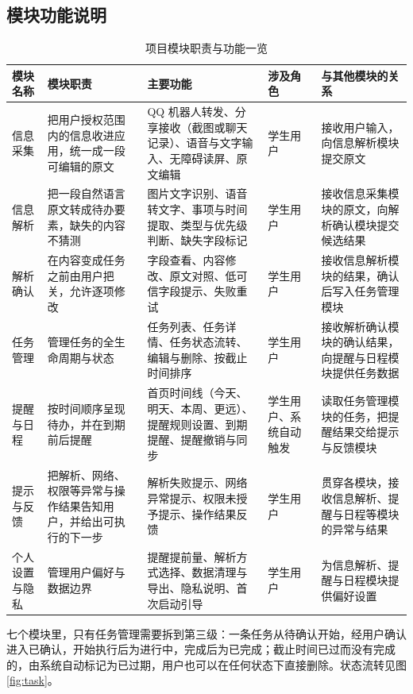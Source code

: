 \documentclass[12pt,a4paper,fontset=windows]{ctexart}
\begin{document}
\subsection{模块功能说明}

\begin{table}[tbp]
\centering
\footnotesize
\begin{tabularx}{\textwidth}{@{}>{\raggedright\arraybackslash}p{2.05cm}>{\raggedright\arraybackslash}p{2.5cm}>{\raggedright\arraybackslash}X>{\raggedright\arraybackslash}p{1.5cm}>{\raggedright\arraybackslash}p{3.75cm}@{}}
\toprule
模块名称 & 模块职责 & 主要功能 & 涉及角色 & 与其他模块的关系 \\
\midrule
信息采集 & 把用户授权范围内的信息收进应用，统一成一段可编辑的原文 & QQ 机器人转发、分享接收（截图或聊天记录）、语音与文字输入、无障碍读屏、原文编辑 & 学生用户 & 接收用户输入，向信息解析模块提交原文 \\
\midrule
信息解析 & 把一段自然语言原文转成待办要素，缺失的内容不猜测 & 图片文字识别、语音转文字、事项与时间提取、类型与优先级判断、缺失字段标记 & 学生用户 & 接收信息采集模块的原文，向解析确认模块提交候选结果 \\
\midrule
解析确认 & 在内容变成任务之前由用户把关，允许逐项修改 & 字段查看、内容修改、原文对照、低可信字段提示、失败重试 & 学生用户 & 接收信息解析模块的结果，确认后写入任务管理模块 \\
\midrule
任务管理 & 管理任务的全生命周期与状态 & 任务列表、任务详情、任务状态流转、编辑与删除、按截止时间排序 & 学生用户 & 接收解析确认模块的确认结果，向提醒与日程模块提供任务数据 \\
\midrule
提醒与日程 & 按时间顺序呈现待办，并在到期前后提醒 & 首页时间线（今天、明天、本周、更远）、提醒规则设置、到期提醒、提醒撤销与同步 & 学生用户、系统自动触发 & 读取任务管理模块的任务，把提醒结果交给提示与反馈模块 \\
\midrule
提示与反馈 & 把解析、网络、权限等异常与操作结果告知用户，并给出可执行的下一步 & 解析失败提示、网络异常提示、权限未授予提示、操作结果反馈 & 学生用户 & 贯穿各模块，接收信息解析、提醒与日程等模块的异常与结果 \\
\midrule
个人设置与隐私 & 管理用户偏好与数据边界 & 提醒提前量、解析方式选择、数据清理与导出、隐私说明、首次启动引导 & 学生用户 & 为信息解析、提醒与日程模块提供偏好设置 \\
\bottomrule
\end{tabularx}
\caption{项目模块职责与功能一览}
\label{tab:modules}
\end{table}

七个模块里，只有任务管理需要拆到第三级：一条任务从待确认开始，经用户确认进入已确认，开始执行后为进行中，完成后为已完成；截止时间已过而没有完成的，由系统自动标记为已过期，用户也可以在任何状态下直接删除。状态流转见图 \ref{fig:task}。
\end{document}
